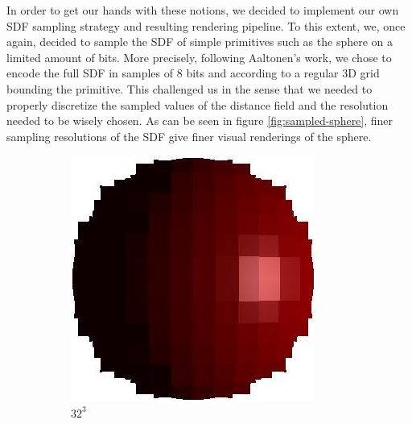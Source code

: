 \documentclass[10pt,a4paper,english, twocolumn]{article}
\begin{document}
In order to get our hands with these notions, we decided to implement our own SDF sampling strategy and resulting rendering pipeline. To this extent, we, once again, decided to sample the SDF of simple primitives such as the sphere on a limited amount of bits. More precisely, following Aaltonen's work, we chose to encode the full SDF in samples of $8$ bits and according to a regular 3D grid bounding the primitive. This challenged us in the sense that we needed to properly discretize the sampled values of the distance field and the resolution needed to be wisely chosen. As can be seen in figure \ref{fig:sampled-sphere}, finer sampling resolutions of the SDF give finer visual renderings of the sphere.

\begin{figure}
    \begin{subfigure}{.3\linewidth}
        \centering
        \includegraphics[width=.9\linewidth]{figures/discretized_sdf_32.JPG}
        \caption{$32^3$}
        \label{sfig:sampled-sphere1}
    \end{subfigure}
    \begin{subfigure}{.3\linewidth}
        \centering

\end{subfigure}
\end{figure}
\end{document}
